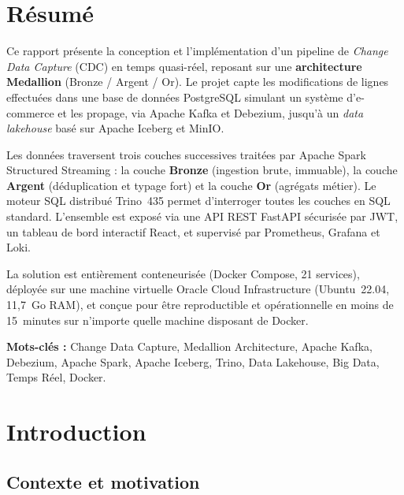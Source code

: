 \documentclass[12pt,a4paper]{report}
\begin{document}
\chapter*{Résumé}

Ce rapport présente la conception et l'implémentation d'un pipeline de
\textit{Change Data Capture} (CDC) en temps quasi-réel, reposant sur une
\textbf{architecture Medallion} (Bronze / Argent / Or). Le projet capte les
modifications de lignes effectuées dans une base de données PostgreSQL
simulant un système d'e-commerce et les propage, via Apache Kafka et
Debezium, jusqu'à un \textit{data lakehouse} basé sur Apache Iceberg et MinIO.

Les données traversent trois couches successives traitées par Apache Spark
Structured Streaming : la couche \textbf{Bronze} (ingestion brute, immuable),
la couche \textbf{Argent} (déduplication et typage fort) et la couche
\textbf{Or} (agrégats métier). Le moteur SQL distribué Trino~435 permet
d'interroger toutes les couches en SQL standard. L'ensemble est exposé via
une API REST FastAPI sécurisée par JWT, un tableau de bord interactif React,
et supervisé par Prometheus, Grafana et Loki.

La solution est entièrement conteneurisée (Docker Compose, 21 services),
déployée sur une machine virtuelle Oracle Cloud Infrastructure (Ubuntu~22.04,
11,7~Go RAM), et conçue pour être reproductible et opérationnelle en moins de
15~minutes sur n'importe quelle machine disposant de Docker.

\bigskip
\textbf{Mots-clés :} Change Data Capture, Medallion Architecture, Apache
Kafka, Debezium, Apache Spark, Apache Iceberg, Trino, Data Lakehouse,
Big Data, Temps Réel, Docker.

\tableofcontents
\listoffigures
\listoftables

\chapter{Introduction}

\section{Contexte et motivation}
\end{document}
